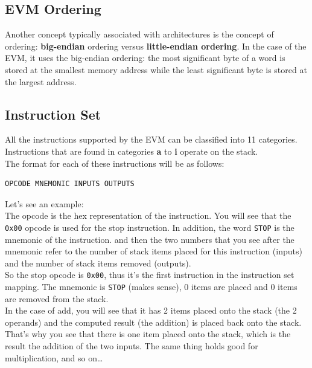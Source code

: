 \subsection*{EVM Ordering}

Another concept typically associated with architectures is the concept of ordering: \textbf{big-endian} ordering versus \textbf{little-endian ordering}.
In the case of the EVM, it uses the big-endian ordering: the most significant byte of a word is stored at the smallest memory address while the least significant byte is stored at the largest address.

\subsection*{Instruction Set}
All the instructions supported by the EVM can be classified into 11 categories.
Instructions that are found in categories \textbf{a} to \textbf{i} operate on the stack.\\

The format for each of these instructions will be as follows:

\begin{lstlisting}[style=defaultStyle]
OPCODE MNEMONIC INPUTS OUTPUTS
\end{lstlisting}

Let's see an example:\\
The opcode is the hex representation of the instruction.
You will see that the \texttt{0x00} opcode is used for the stop instruction.
In addition, the word \texttt{STOP} is the mnemonic of the instruction. and then the two numbers that you see after the mnemonic refer to the number of stack items placed for this instruction (inputs) and the number of stack items removed (outputs).\\

So the stop opcode is \texttt{0x00}, thus it's the first instruction in the instruction set mapping.
The mnemonic is \texttt{STOP} (makes sense), 0 items are placed and 0 items are removed from the stack.\\

In the case of add, you will see that it has 2 items placed onto the stack (the 2 operands) and the computed result (the addition) is placed back onto the stack.
That's why you see that there is one item placed onto the stack, which is the result the addition of the two inputs. The same thing holds good for multiplication, and so on\dots\\

